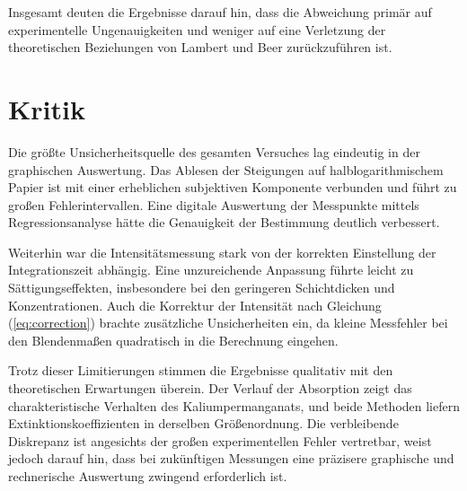 Insgesamt deuten die Ergebnisse darauf hin, dass die Abweichung primär auf experimentelle Ungenauigkeiten und weniger auf eine Verletzung der theoretischen Beziehungen von Lambert und Beer zurückzuführen ist.  

\section{Kritik}  
Die größte Unsicherheitsquelle des gesamten Versuches lag eindeutig in der graphischen Auswertung. Das Ablesen der Steigungen auf halblogarithmischem Papier ist mit einer erheblichen subjektiven Komponente verbunden und führt zu großen Fehlerintervallen. Eine digitale Auswertung der Messpunkte mittels Regressionsanalyse hätte die Genauigkeit der Bestimmung deutlich verbessert.  

Weiterhin war die Intensitätsmessung stark von der korrekten Einstellung der Integrationszeit abhängig. Eine unzureichende Anpassung führte leicht zu Sättigungseffekten, insbesondere bei den geringeren Schichtdicken und Konzentrationen. Auch die Korrektur der Intensität nach Gleichung (\ref{eq:correction}) brachte zusätzliche Unsicherheiten ein, da kleine Messfehler bei den Blendenmaßen quadratisch in die Berechnung eingehen.  

Trotz dieser Limitierungen stimmen die Ergebnisse qualitativ mit den theoretischen Erwartungen überein. Der Verlauf der Absorption zeigt das charakteristische Verhalten des Kaliumpermanganats, und beide Methoden liefern Extinktionskoeffizienten in derselben Größenordnung. Die verbleibende Diskrepanz ist angesichts der großen experimentellen Fehler vertretbar, weist jedoch darauf hin, dass bei zukünftigen Messungen eine präzisere graphische und rechnerische Auswertung zwingend erforderlich ist.
